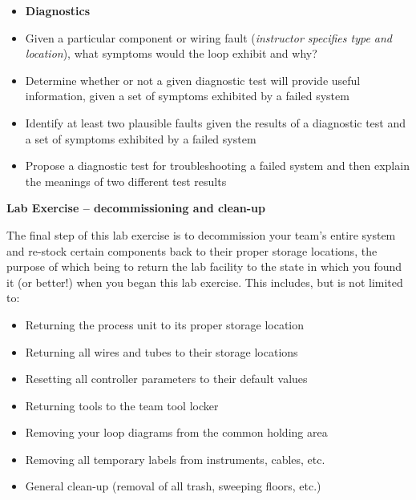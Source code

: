 \filbreak


\begin{itemize}
\item{} {\bf Diagnostics}
\item{} Given a particular component or wiring fault ({\it instructor specifies type and location}), what symptoms would the loop exhibit and why?
\item{} Determine whether or not a given diagnostic test will provide useful information, given a set of symptoms exhibited by a failed system
\item{} Identify at least two plausible faults given the results of a diagnostic test and a set of symptoms exhibited by a failed system
\item{} Propose a diagnostic test for troubleshooting a failed system and then explain the meanings of two different test results
\end{itemize}














\vfil \eject

\noindent
{\bf Lab Exercise -- decommissioning and clean-up}

\vskip 5pt

The final step of this lab exercise is to decommission your team's entire system and re-stock certain components back to their proper storage locations, the purpose of which being to return the lab facility to the state in which you found it (or better!) when you began this lab exercise.  This includes, but is not limited to:

\begin{itemize}
\item{} Returning the process unit to its proper storage location
\item{} Returning all wires and tubes to their storage locations
\item{} Resetting all controller parameters to their default values
\item{} Returning tools to the team tool locker
\item{} Removing your loop diagrams from the common holding area
\item{} Removing all temporary labels from instruments, cables, etc.
\item{} General clean-up (removal of all trash, sweeping floors, etc.)
\end{itemize}

